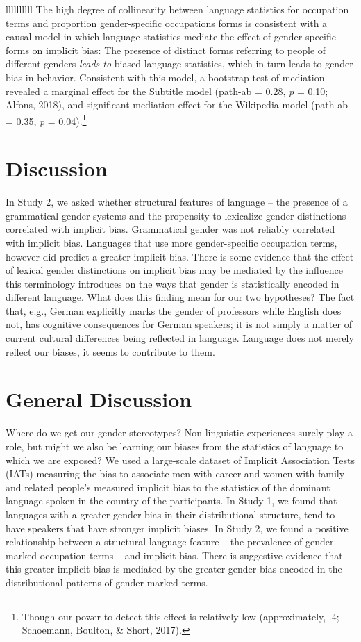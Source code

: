 \documentclass[9pt,twocolumn,twoside,lineno]{pnas-new}
\begin{document}
\begin{table}{llllllllll}
The high degree of collinearity between language statistics for
occupation terms and proportion gender-specific occupations forms is
consistent with a causal model in which language statistics mediate the
effect of gender-specific forms on implicit bias: The presence of
distinct forms referring to people of different genders \emph{leads to}
biased language statistics, which in turn leads to gender bias in
behavior. Consistent with this model, a bootstrap test of mediation
revealed a marginal effect for the Subtitle model (path-ab = 0.28,
\emph{p} = 0.10; Alfons, 2018), and significant mediation effect for the
Wikipedia model (path-ab = 0.35, \emph{p} =
0.04).\footnote{Though our power to detect this effect is relatively low (approximately, .4; Schoemann, Boulton, \& Short, 2017).}

\section*{Discussion}\label{discussion-1}

In Study 2, we asked whether structural features of language -- the
presence of a grammatical gender systems and the propensity to
lexicalize gender distinctions -- correlated with implicit bias.
Grammatical gender was not reliably correlated with implicit bias.
Languages that use more gender-specific occupation terms, however did
predict a greater implicit bias. There is some evidence that the effect
of lexical gender distinctions on implicit bias may be mediated by the
influence this terminology introduces on the ways that gender is
statistically encoded in different language. What does this finding mean
for our two hypotheses? The fact that, e.g., German explicitly marks the
gender of professors while English does not, has cognitive consequences
for German speakers; it is not simply a matter of current cultural
differences being reflected in language. Language does not merely
reflect our biases, it seems to contribute to them.

\section*{General Discussion}\label{general-discussion}

Where do we get our gender stereotypes? Non-linguistic experiences
surely play a role, but might we also be learning our biases from the
statistics of language to which we are exposed? We used a large-scale
dataset of Implicit Association Tests (IATs) measuring the bias to
associate men with career and women with family and related people's
measured implicit bias to the statistics of the dominant language spoken
in the country of the participants. In Study 1, we found that languages
with a greater gender bias in their distributional structure, tend to
have speakers that have stronger implicit biases. In Study 2, we found a
positive relationship between a structural language feature -- the
prevalence of gender-marked occupation terms -- and implicit bias. There
is suggestive evidence that this greater implicit bias is mediated by
the greater gender bias encoded in the distributional patterns of
gender-marked terms.


\end{table}
\end{document}
